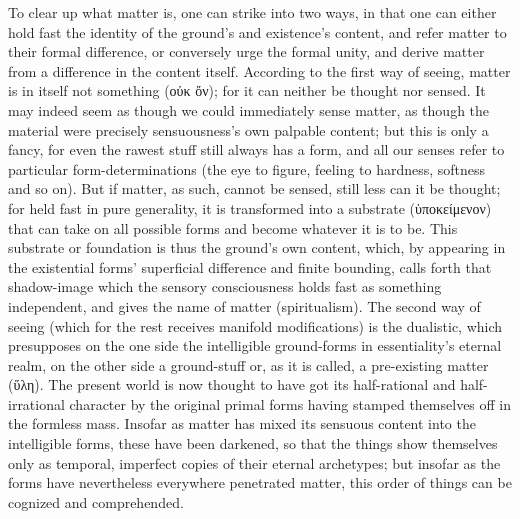 \documentclass[12pt]{book}
\begin{document}
To clear up what matter is, one can strike into two ways, in that one can
either hold fast the identity of the ground's and existence's content, and
refer matter to their formal difference, or conversely urge the formal
unity, and derive matter from a difference in the content itself. According
to the first way of seeing, matter is in itself not something (οὐκ ὄν); for
it can neither be thought nor sensed. It may indeed seem as though we could
immediately sense matter, as though the material were precisely
sensuousness's own palpable content; but this is only a fancy, for even the
rawest stuff still always has a form, and all our senses refer to particular
form-determinations (the eye to figure, feeling to hardness, softness and so
on). But if matter, as such, cannot be sensed, still less can it be thought;
for held fast in pure generality, it is transformed into a substrate
(ὑποκείμενον) that can take on all possible forms and become whatever it is
to be. This substrate or foundation is thus the ground's own content, which,
by appearing in the existential forms' superficial difference and finite
bounding, calls forth that shadow-image which the sensory consciousness
holds fast as something independent, and gives the name of matter
(spiritualism). The second way of seeing (which for the rest receives
manifold modifications) is the dualistic, which presupposes on the one side
the intelligible ground-forms in essentiality's eternal realm, on the other
side a ground-stuff or, as it is called, a pre-existing matter (ὕλη). The
present world is now thought to have got its half-rational and
half-irrational character by the original primal forms having stamped
themselves off in the formless mass. Insofar as matter has mixed its
sensuous content into the intelligible forms, these have been darkened, so
that the things show themselves only as temporal, imperfect copies of their
eternal archetypes; but insofar as the forms have nevertheless everywhere
penetrated matter, this order of things can be cognized and comprehended.
\end{document}
